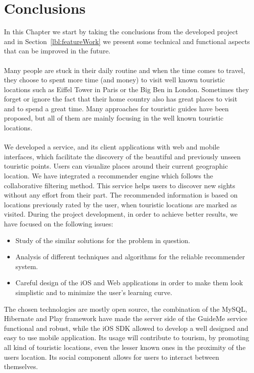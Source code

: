 \chapter{Conclusions}
\label{conclusions}
In this Chapter we start by taking the conclusions from the developed project and in Section~\ref{lbl:featureWork} we present some technical and functional aspects that can be improved in the future.\\
\\
Many people are stuck in their daily routine and when the time comes to travel, they choose to spent more time (and money) to visit well known touristic locations such as Eiffel Tower in Paris or the Big Ben in London. Sometimes they forget or ignore the fact that their home country also has great places to visit and to spend a great time. Many approaches for touristic guides have been proposed, but all of them are mainly focusing in the well known touristic locations.\\
\\
We developed a service, and its client applications with web and mobile interfaces, which facilitate the discovery of the beautiful and previously unseen touristic points. Users can visualize places around their current geographic location. We have integrated a recommender engine which follows the collaborative filtering method. This service helps users to discover new sights without any effort from their part. The recommended information is based on locations previously rated by the user, when touristic locations are marked as visited. During the project development, in order to achieve better results, we have focused on the following issues:
\begin{itemize}
\item Study of the similar solutions for the problem in question.
\item Analysis of different techniques and algorithms for the reliable recommender system.
\item Careful design of the iOS and Web applications in order to make them look simplistic and to minimize the user's learning curve.
\end{itemize}
The chosen technologies are mostly open source, the combination of the MySQL, Hibernate and Play framework have made the server side of the GuideMe service functional and robust, while the iOS SDK allowed to develop a well designed and easy to use mobile application. Its usage will contribute to tourism, by promoting all kind of touristic locations, even the lesser known ones in the proximity of the users location. Its social component allows for users to interact between themselves.

